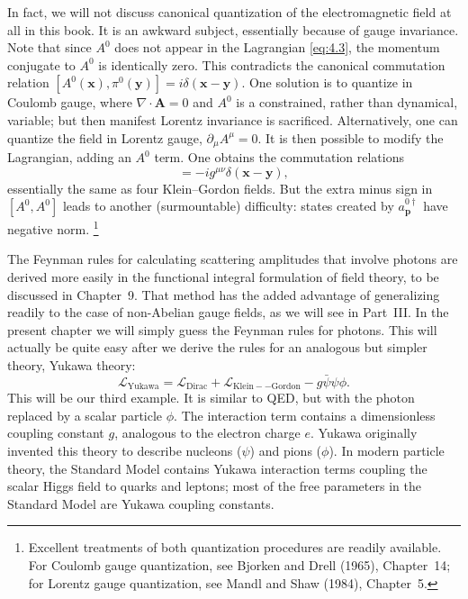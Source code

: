 In fact, we will not discuss canonical quantization of the electromagnetic
field at all in this book.  It is an awkward subject, essentially because of
gauge invariance.  Note that since $A^0$ does not appear in the Lagrangian
\eqref{eq:4.3}, the momentum conjugate to $A^0$ is identically zero.  This
contradicts the canonical commutation relation $[A^0(\mathbf{x}),
\pi^0(\mathbf{y})] = i\delta(\mathbf{x}-\mathbf{y})$.  One solution is to
quantize in Coulomb gauge, where $\nabla\cdot\mathbf{A} = 0$ and $A^0$ is a
constrained, rather than dynamical, variable; but then manifest Lorentz
invariance is sacrificed.  Alternatively, one can quantize the field in
Lorentz gauge, $\partial_\mu A^\mu = 0$.  It is then possible to modify the
Lagrangian, adding an $A^0$ term.  One obtains the commutation relations
\begin{equation}
  [A^\mu(\mathbf{x}), A^\nu(\mathbf{y})] = -ig^{\mu\nu}\delta(\mathbf{x}-\mathbf{y}),
\end{equation}
essentially the same as four Klein--Gordon fields.  But the extra minus sign
in $[A^0, A^0]$ leads to another (surmountable) difficulty: states created by
$a_{\mathbf{p}}^{0\dagger}$ have negative norm.%
\footnote{Excellent treatments of both quantization procedures are readily
available.  For Coulomb gauge quantization, see Bjorken and Drell (1965),
Chapter~14; for Lorentz gauge quantization, see Mandl and Shaw (1984),
Chapter~5.}

The Feynman rules for calculating scattering amplitudes that involve
photons are derived more easily in the functional integral formulation of
field theory, to be discussed in Chapter~9.  That method has the added
advantage of generalizing readily to the case of non-Abelian gauge fields, as
we will see in Part~III.  In the present chapter we will simply guess the
Feynman rules for photons.  This will actually be quite easy after we derive
the rules for an analogous but simpler theory, Yukawa theory:
\begin{equation}
  \mathcal{L}_{\mathrm{Yukawa}} = \mathcal{L}_{\mathrm{Dirac}}
    + \mathcal{L}_{\mathrm{Klein--Gordon}} - g\bar{\psi}\psi\phi .
  \label{eq:4.9}
\end{equation}
This will be our third example.  It is similar to QED, but with the photon
replaced by a scalar particle $\phi$.  The interaction term contains a
dimensionless coupling constant $g$, analogous to the electron charge $e$.
Yukawa originally invented this theory to describe nucleons ($\psi$) and
pions ($\phi$).  In modern particle theory, the Standard Model contains
Yukawa interaction terms coupling the scalar Higgs field to quarks and
leptons; most of the free parameters in the Standard Model are Yukawa
coupling constants.

